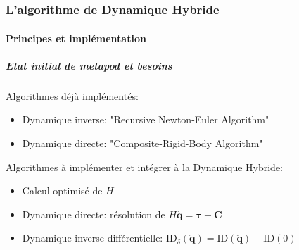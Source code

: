 \documentclass[10pt]{beamer}
\begin{document}
\begin{frame}
\end{frame}


\part{}
\section{L'algorithme de Dynamique Hybride}

\subsection{Principes et implémentation}

\begin{frame}
  \frametitle{Etat initial de metapod et besoins}
 
  Algorithmes déjà implémentés:
  \begin{itemize}
  \item Dynamique inverse:	"Recursive Newton-Euler Algorithm"
  \item Dynamique directe:	"Composite-Rigid-Body Algorithm"
  \end{itemize}
  \bigskip
  Algorithmes à implémenter et intégrer à la Dynamique Hybride:
  \begin{itemize}
  \item Calcul optimisé de $H$
  \item Dynamique directe:	résolution de $H \boldsymbol{\ddot{q} = \tau - C}$
  \item Dynamique inverse différentielle: $\mathrm{ID}_{\delta}(\boldsymbol{\ddot{q}}) = \mathrm{ID}(\boldsymbol{\ddot{q}}) - \mathrm{ID}(0)$
  \end{itemize}
  
\end{frame}
\end{document}
